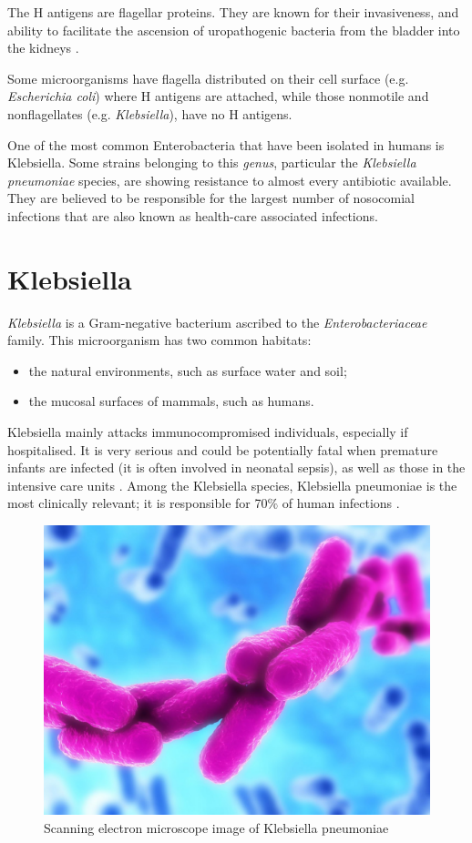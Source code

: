 \documentclass[11pt]{report}
\begin{document}
The H antigens are flagellar proteins.
They are known for their invasiveness, and ability to facilitate the ascension of uropathogenic bacteria from the bladder into the kidneys \cite{wiles2008origins}.

Some microorganisms have flagella distributed on their cell surface (e.g. \emph{Escherichia coli}) where H antigens are attached, while those nonmotile and nonflagellates (e.g. \emph{Klebsiella}), have no H antigens.

One of the most common Enterobacteria that have been isolated in humans is Klebsiella.
Some strains belonging to this \emph{genus}, particular the \emph{Klebsiella pneumoniae} species, are showing resistance to almost every antibiotic available.
They are believed to be responsible for the largest number of nosocomial infections that are also known as health-care associated infections.

\clearpage
\section{Klebsiella}
\emph{Klebsiella} is a Gram-negative bacterium ascribed to the \emph{Enterobacteriaceae} family.
This microorganism has two common habitats: 

\begin{itemize}
\item the natural environments, such as surface water and soil;
\item the mucosal surfaces of mammals, such as humans.
\end{itemize}

Klebsiella mainly attacks immunocompromised individuals, especially if hospitalised.
It is very serious and could be potentially fatal when premature infants are infected (it is often involved in neonatal sepsis), as well as those in the intensive care units \cite{podschun1998klebsiella}.
Among the Klebsiella species, Klebsiella pneumoniae is the most clinically relevant; it is responsible for 70$\%$ of human infections \cite{Pitout2015}.

\begin{figure}[htp]
\centering
\includegraphics[scale=0.30]{img/Klebsiella_pneumoniae.jpg}
\caption{Scanning electron microscope image of Klebsiella pneumoniae}
\label{}
\end{figure}
\end{document}
